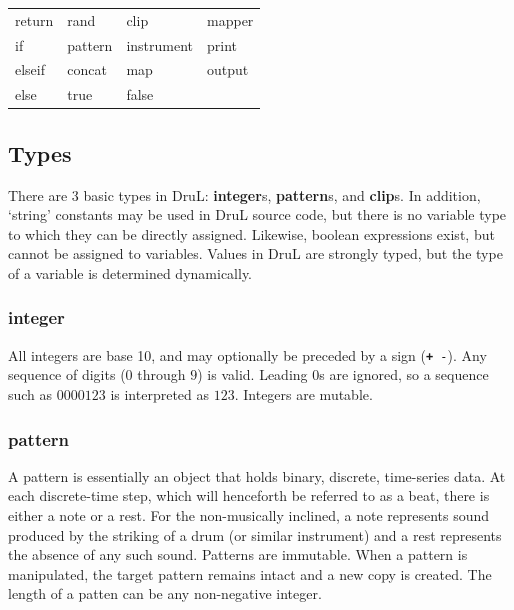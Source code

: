 \begin{table}[htb]
\begin{center} 
\begin{tabular}{llll} 
  return   & rand    & clip       & mapper \\
  if     & pattern & instrument & print  \\
  elseif & concat  & map     & output \\
  else   & true    & false &
\end{tabular}
\label{tab:keywords}
\end{center} 
\end{table}



\subsection{Types}

There are $3$ basic types in DruL: \textbf{integer}s, \textbf{pattern}s,
and \textbf{clip}s.  In addition, `string' constants may be used in DruL source code, but there is no variable type to which they can be directly assigned.
Likewise, boolean expressions exist, but cannot be assigned to variables.
Values in DruL are strongly typed, but the type of a variable is determined dynamically.

\subsubsection{integer}

All integers are base 10, and may optionally be preceded by a sign ({\tt \textbf + -}).
Any sequence of digits ($0$ through $9$) is valid.  Leading $0$s are ignored, so a sequence such as $0000123$  is interpreted as $123$.  Integers are mutable.

\subsubsection{pattern}

A pattern is essentially an object that holds binary, discrete, time-series data.  At each discrete-time step, which will henceforth be referred to as a beat, there is either a note or a rest.  For the non-musically inclined, a note represents sound produced by the striking of a drum (or similar instrument) and a rest represents the absence of any such sound.  Patterns are immutable.  When a pattern is manipulated, the target pattern remains intact and a new copy is created.  The length of a patten can be any non-negative integer.

